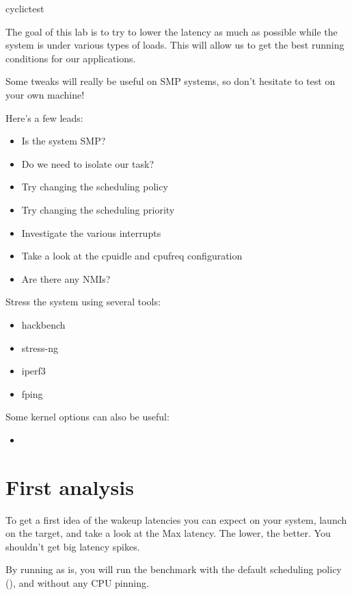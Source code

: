 \begin{bashinput}
cyclictest
\end{bashinput}

The goal of this lab is to try to lower the latency as much as possible while
the system is under various types of loads. This will allow us to get the
best running conditions for our applications.

Some tweaks will really be useful on SMP systems, so don't hesitate to test on
your own machine!

Here's a few leads:

\begin{itemize}
	\item Is the system SMP?
	\item Do we need to isolate our task?
	\item Try changing the scheduling policy
	\item Try changing the scheduling priority
	\item Investigate the various interrupts
	\item Take a look at the cpuidle and cpufreq configuration
	\item Are there any NMIs?
\end{itemize}

Stress the system using several tools:

\begin{itemize}
	\item hackbench
	\item stress-ng
	\item iperf3
	\item fping
\end{itemize}

Some kernel options can also be useful:

\begin{itemize}
	\item {}
\end{itemize}

\section{First analysis}

To get a first idea of the wakeup latencies you can expect on your system, launch
 on the target, and take a look at the Max latency. The lower, the
better. You shouldn't get big latency spikes.

By running  as is, you will run the benchmark with the default
scheduling policy (), and without any CPU pinning.


